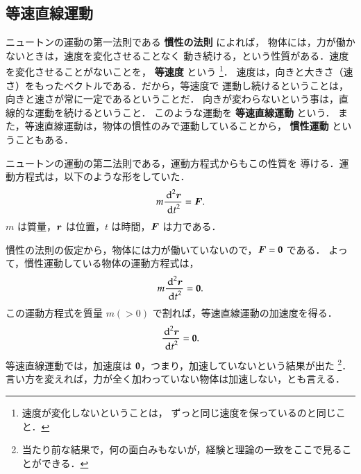         \subsection{等速直線運動}
            ニュートンの運動の第一法則である \textbf{慣性の法則} によれば，
            物体には，力が働かないときは，速度を変化させることなく
            動き続ける，という性質がある．速度を変化させることがないことを，
            \textbf{等速度} という
                \footnote{
                    速度が変化しないということは，
                    ずっと同じ速度を保っているのと同じこと．
                }．
            速度は，向きと大きさ（速さ）をもったベクトルである．だから，等速度で
            運動し続けるということは，向きと速さが常に一定であるということだ．
            向きが変わらないという事は，直線的な運動を続けるということ．
            このような運動を \textbf{等速直線運動} という．
            また，等速直線運動は，物体の慣性のみで運動していることから，
            \textbf{慣性運動} ということもある．

            ニュートンの運動の第二法則である，運動方程式からもこの性質を
            導ける．運動方程式は，以下のような形をしていた．
                \begin{equation*}
                    m \frac{{\,\mathrm{d}}^{2} \boldsymbol{r}}{{\,\mathrm{d} t}^{2}} = \boldsymbol{F}.
                \end{equation*}
            $m$ は質量，$\boldsymbol{r}$ は位置，$t$ は時間，$\boldsymbol{F}$ は力である．

            慣性の法則の仮定から，物体には力が働いていないので，$\boldsymbol{F}=\textbf{0}$ である．
            よって，慣性運動している物体の運動方程式は，
                \begin{align}
                    m \frac{{\,\mathrm{d}}^{2} \boldsymbol{r}}{{\,\mathrm{d} t}^{2}} = \textbf{0}.
                \end{align}
            この運動方程式を質量 $m(>0)$ で割れば，等速直線運動の加速度を得る．
                \begin{align}
                    \frac{{\,\mathrm{d}}^{2} \boldsymbol{r}}{{\,\mathrm{d} t}^{2}} = \textbf{0}.
                \end{align}
            等速直線運動では，加速度は $\textbf{0}$，つまり，加速していないという結果が出た
                \footnote{
                    当たり前な結果で，何の面白みもないが，経験と理論の一致をここで見ることができる．
                }．
            言い方を変えれば，力が全く加わっていない物体は加速しない，とも言える．

